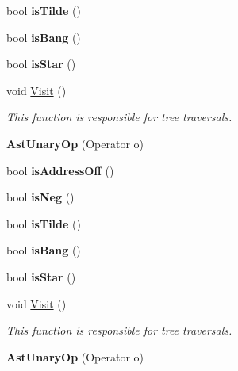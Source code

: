 \begin{DoxyCompactItemize}
\item 
\hypertarget{classAstUnaryOp_a02f2cdfdcf75a4c41cfd2168465c16b0}{bool {\bfseries is\-Tilde} ()}\label{classAstUnaryOp_a02f2cdfdcf75a4c41cfd2168465c16b0}

\item 
\hypertarget{classAstUnaryOp_ab9c6693eaa03da4daf18dc43f01c73d5}{bool {\bfseries is\-Bang} ()}\label{classAstUnaryOp_ab9c6693eaa03da4daf18dc43f01c73d5}

\item 
\hypertarget{classAstUnaryOp_aab9cd20f2a71757480827cb44b7cb0a3}{bool {\bfseries is\-Star} ()}\label{classAstUnaryOp_aab9cd20f2a71757480827cb44b7cb0a3}

\item 
void \hyperlink{classAstUnaryOp_a23e13d42f33d5882d58ca48e8053f1a0}{Visit} ()
\begin{DoxyCompactList}\small\item\em This function is responsible for tree traversals. \end{DoxyCompactList}\item 
\hypertarget{classAstUnaryOp_aa363b2df2fbb4653a683899e59df2080}{{\bfseries Ast\-Unary\-Op} (Operator o)}\label{classAstUnaryOp_aa363b2df2fbb4653a683899e59df2080}

\item 
\hypertarget{classAstUnaryOp_a636862fa8cc5f8308eeed666e8cce5a4}{bool {\bfseries is\-Address\-Off} ()}\label{classAstUnaryOp_a636862fa8cc5f8308eeed666e8cce5a4}

\item 
\hypertarget{classAstUnaryOp_a7dddcaa6c182d6012e35d124c25c8e22}{bool {\bfseries is\-Neg} ()}\label{classAstUnaryOp_a7dddcaa6c182d6012e35d124c25c8e22}

\item 
\hypertarget{classAstUnaryOp_a02f2cdfdcf75a4c41cfd2168465c16b0}{bool {\bfseries is\-Tilde} ()}\label{classAstUnaryOp_a02f2cdfdcf75a4c41cfd2168465c16b0}

\item 
\hypertarget{classAstUnaryOp_ab9c6693eaa03da4daf18dc43f01c73d5}{bool {\bfseries is\-Bang} ()}\label{classAstUnaryOp_ab9c6693eaa03da4daf18dc43f01c73d5}

\item 
\hypertarget{classAstUnaryOp_aab9cd20f2a71757480827cb44b7cb0a3}{bool {\bfseries is\-Star} ()}\label{classAstUnaryOp_aab9cd20f2a71757480827cb44b7cb0a3}

\item 
void \hyperlink{classAstUnaryOp_a23e13d42f33d5882d58ca48e8053f1a0}{Visit} ()
\begin{DoxyCompactList}\small\item\em This function is responsible for tree traversals. \end{DoxyCompactList}\item 
\hypertarget{classAstUnaryOp_aa363b2df2fbb4653a683899e59df2080}{{\bfseries Ast\-Unary\-Op} (Operator o)}\label{classAstUnaryOp_aa363b2df2fbb4653a683899e59df2080}


\end{DoxyCompactItemize}
